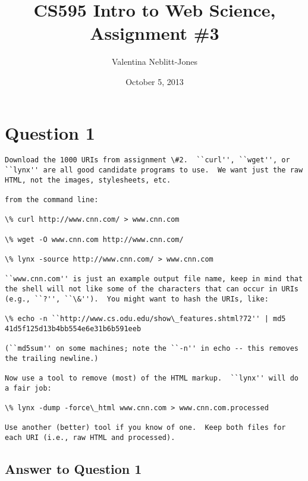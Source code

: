 \documentclass{article}
\begin{document}
\title{CS595 Intro to Web Science, Assignment \#3}
\author{Valentina Neblitt-Jones}
\date{October 5, 2013}
\maketitle

\section*{Question 1}
\begin{verbatim}
Download the 1000 URIs from assignment \#2.  ``curl'', ``wget'', or ``lynx'' are all good candidate programs to use.  We want just the raw HTML, not the images, stylesheets, etc.

from the command line:

\% curl http://www.cnn.com/ > www.cnn.com

\% wget -O www.cnn.com http://www.cnn.com/

\% lynx -source http://www.cnn.com/ > www.cnn.com

``www.cnn.com'' is just an example output file name, keep in mind that the shell will not like some of the characters that can occur in URIs (e.g., ``?'', ``\&'').  You might want to hash the URIs, like:

\% echo -n ``http://www.cs.odu.edu/show\_features.shtml?72'' | md5
41d5f125d13b4bb554e6e31b6b591eeb

(``md5sum'' on some machines; note the ``-n'' in echo -- this removes the trailing newline.) 

Now use a tool to remove (most) of the HTML markup.  ``lynx'' will do a fair job:

\% lynx -dump -force\_html www.cnn.com > www.cnn.com.processed

Use another (better) tool if you know of one.  Keep both files for each URI (i.e., raw HTML and processed).
\end{verbatim}

\subsection*{Answer to Question 1}
\end{document}
